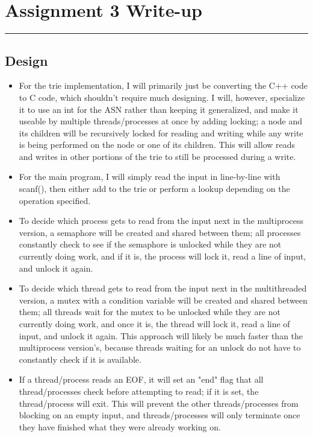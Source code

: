 \documentclass[letterpaper,10pt,fleqn]{article}
\numberwithin{equation}{section}
\begin{document}

\section*{Assignment 3 Write-up}
\hrule

\subsection*{Design}
\begin{itemize}
    \item For the trie implementation, I will primarily just be converting the C++ code to C code, which shouldn't require much designing.  I will, however, specialize it to use an int for the ASN rather than keeping it generalized, and make it useable by multiple threads/processes at once by adding locking; a node and its children will be recursively locked for reading and writing while any write is being performed on the node or one of its children.  This will allow reads and writes in other portions of the trie to still be processed during a write.
    \item For the main program, I will simply read the input in line-by-line with scanf(), then either add to the trie or perform a lookup depending on the operation specified.
    \item To decide which process gets to read from the input next in the multiprocess version, a semaphore will be created and shared between them; all processes constantly check to see if the semaphore is unlocked while they are not currently doing work, and if it is, the process will lock it, read a line of input, and unlock it again.
    \item To decide which thread gets to read from the input next in the multithreaded version, a mutex with a condition variable will be created and shared between them; all threads wait for the mutex to be unlocked while they are not currently doing work, and once it is, the thread will lock it, read a line of input, and unlock it again.  This approach will likely be much faster than the multiprocess version's, because threads waiting for an unlock do not have to constantly check if it is available.
    \item If a thread/process reads an EOF, it will set an "end" flag that all thread/processes check before attempting to read; if it is set, the thread/process will exit.  This will prevent the other threads/processes from blocking on an empty input, and threads/processes will only terminate once they have finished what they were already working on.
\end{itemize}
\end{document}

